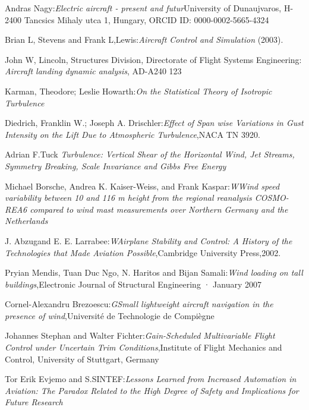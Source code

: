 \documentclass[conference]{IEEEtran}
\begin{document}
\begin{thebibliography}{00}
 Andras Nagy:\emph{Electric aircraft - present and futur}University of Dunaujvaros, H-2400 Tancsics Mihaly utca 1, Hungary, ORCID ID: 0000-0002-5665-4324

  Brian L, Stevens and Frank L,Lewis:\emph{Aircraft Control and Simulation} (2003).

John W, Lincoln, Structures Division, Directorate of Flight Systems Engineering: \emph{Aircraft landing dynamic analysis}, AD-A240 123

 Karman, Theodore; Leslie Howarth:\emph{On the Statistical Theory of Isotropic Turbulence}

 Diedrich, Franklin W.; Joseph A. Drischler:\emph{Effect of Span wise Variations in Gust Intensity on the Lift Due to Atmospheric Turbulence},NACA TN 3920.

 Adrian F.Tuck \emph{Turbulence: Vertical Shear of the Horizontal Wind, Jet Streams, Symmetry Breaking, Scale Invariance and Gibbs Free Energy}

   Michael Borsche, Andrea K. Kaiser-Weiss, and Frank Kaspar:\emph{WWind speed variability between 10 and 116 m height from the regional reanalysis COSMO-REA6 compared to wind mast measurements over Northern Germany and the Netherlands}

   J. Abzugand E. E. Larrabee:\emph{WAirplane Stability and Control: A History of the Technologies that Made Aviation Possible},Cambridge University Press,2002.

  Pryian Mendis, Tuan Duc Ngo, N.
Haritos and Bijan Samali:\emph{Wind loading on tall buildings},Electronic Journal of Structural Engineering · January 2007

 Cornel-Alexandru Brezoescu:\emph{GSmall lightweight aircraft navigation in the presence of wind},Université de Technologie de Compiègne

 Johannes Stephan and Walter Fichter:\emph{Gain-Scheduled Multivariable Flight Control under Uncertain Trim Conditions},Institute of Flight Mechanics and Control, University of Stuttgart, Germany

 Tor Erik Evjemo and S.SINTEF:\emph{Lessons Learned from Increased Automation in Aviation: The Paradox Related to the High Degree of Safety and Implications for Future Research}
\end{thebibliography}
\vspace{12pt}
\end{document}
